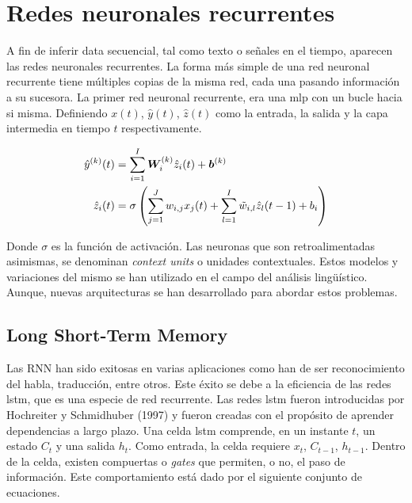 \section{Redes neuronales recurrentes} \label{sec:rnn}

\indent A fin de inferir data secuencial, tal como texto o señales en el tiempo, aparecen las redes neuronales
recurrentes. La forma más simple de una red neuronal recurrente tiene múltiples copias de la misma red, cada una
pasando información a su sucesora. La primer red neuronal recurrente, era una \acrshort{mlp} con un bucle hacia si
misma. Definiendo $x(t)$, $\hat{y}(t)$, $\hat{z}(t)$ como la entrada, la salida y la capa intermedia en tiempo $t$
respectivamente.

\begin{align*}
  \hat{y}^{(k)}(t) &= \sum_{i=1}^{I} \bm{W}_i^{(k)} \hat{z}_i(t) + \bm{b}^{(k)} \\
  \hat{z}_i(t) &= \sigma\left(\sum_{j=1}^J w_{i,j}x_j(t) + \sum_{l=1}^I \Tilde{w}_{i,l} \hat{z}_l(t-1) + b_i \right)
\end{align*}

\indent Donde $\sigma$ es la función de activación. Las neuronas que son retroalimentadas asimismas, se denominan
\textit{context units} o unidades contextuales. Estos modelos y variaciones del mismo se han utilizado en el campo
del análisis lingüístico. Aunque, nuevas arquitecturas se han desarrollado para abordar estos problemas.

\subsection*{Long Short-Term Memory}

\indent Las RNN han sido exitosas en varias aplicaciones como han de ser reconocimiento del habla, traducción, entre
otros. Este éxito se debe a la eficiencia de las redes \acrshort{lstm}, que es una especie de red recurrente. Las
redes \acrshort{lstm} fueron introducidas por Hochreiter y Schmidhuber (1997) \cite{pp:hochreiter-schmidhuber} y
fueron creadas con el propósito de aprender dependencias a largo plazo. Una celda \acrshort{lstm} comprende, en un
instante $t$, un estado $C_t$ y una salida $h_t$. Como entrada, la celda requiere $x_t$, $C_{t-1}$, $h_{t-1}$.
Dentro de la celda, existen compuertas o \textit{gates} que permiten, o no, el paso de información. Este
comportamiento está dado por el siguiente conjunto de ecuaciones.

